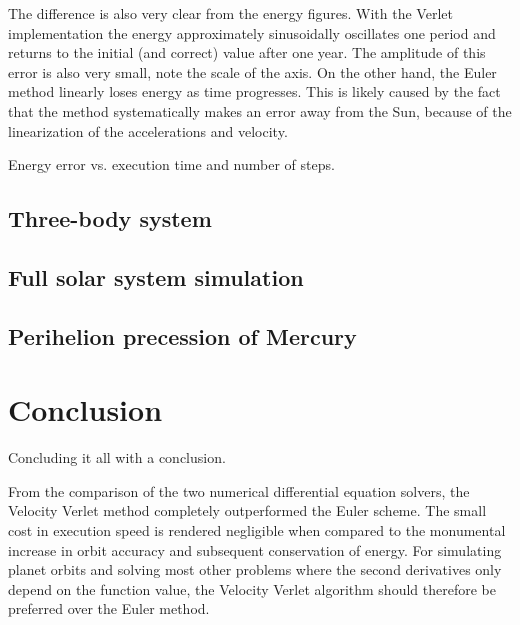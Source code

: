 \documentclass[aps,reprint]{revtex4-1}
\newcommand\blankpage{%
  \null
  \thispagestyle{empty}%
  \addtocounter{page}{-1}%
  \newpage}
\begin{document}
The difference is also very clear from the energy figures. With the Verlet
implementation the energy approximately sinusoidally oscillates one period
and returns to the initial (and correct) value after one year. The amplitude of
this error is also very small, note the scale of the axis.
On the other hand, the Euler method linearly loses energy as time progresses. This
is likely caused by the fact that the method systematically makes an error away
from the Sun, because of the linearization of the accelerations and velocity.

Energy error vs. execution time and number of steps.
\subsection{Three-body system}

\subsection{Full solar system simulation}

\subsection{Perihelion precession of Mercury}

\section{Conclusion}
\label{sec:conclusion}
Concluding it all with a conclusion.

From the comparison of the two numerical differential equation solvers, the
Velocity Verlet method completely outperformed the Euler scheme. The small
cost in execution speed is rendered negligible when compared to the monumental
increase in orbit accuracy and subsequent conservation of energy. For simulating planet
orbits and solving most other problems where the second derivatives only depend
on the function value, the Velocity Verlet algorithm should therefore be
preferred over the Euler method.

\blankpage
\appendix
\end{document}
